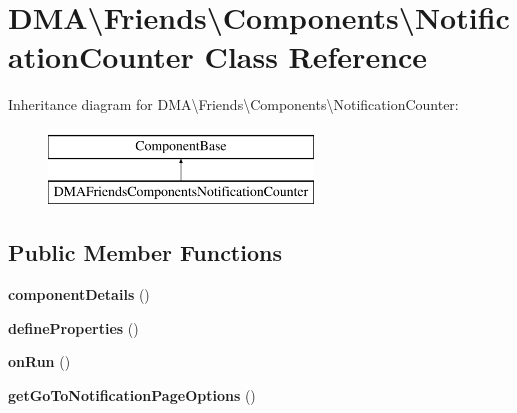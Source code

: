\hypertarget{classDMA_1_1Friends_1_1Components_1_1NotificationCounter}{\section{D\+M\+A\textbackslash{}Friends\textbackslash{}Components\textbackslash{}Notification\+Counter Class Reference}
\label{classDMA_1_1Friends_1_1Components_1_1NotificationCounter}
}
Inheritance diagram for D\+M\+A\textbackslash{}Friends\textbackslash{}Components\textbackslash{}Notification\+Counter\+:\begin{figure}[H]
\begin{center}
\leavevmode
\includegraphics[height=2.000000cm]{d7/def/classDMA_1_1Friends_1_1Components_1_1NotificationCounter}
\end{center}
\end{figure}
\subsection*{Public Member Functions}
\begin{DoxyCompactItemize}
\item 
\hypertarget{classDMA_1_1Friends_1_1Components_1_1NotificationCounter_a670cc0b67254ca6330cb90e78d00ec50}{{\bfseries component\+Details} ()}\label{classDMA_1_1Friends_1_1Components_1_1NotificationCounter_a670cc0b67254ca6330cb90e78d00ec50}

\item 
\hypertarget{classDMA_1_1Friends_1_1Components_1_1NotificationCounter_acc9c8dda0d8fcb5d55f8b6bdcd93914e}{{\bfseries define\+Properties} ()}\label{classDMA_1_1Friends_1_1Components_1_1NotificationCounter_acc9c8dda0d8fcb5d55f8b6bdcd93914e}

\item 
\hypertarget{classDMA_1_1Friends_1_1Components_1_1NotificationCounter_a11868691e1796cd39a3821cf8fa752a0}{{\bfseries on\+Run} ()}\label{classDMA_1_1Friends_1_1Components_1_1NotificationCounter_a11868691e1796cd39a3821cf8fa752a0}

\item 
\hypertarget{classDMA_1_1Friends_1_1Components_1_1NotificationCounter_aa2ef7ee56cae987954e55457d8f790c4}{{\bfseries get\+Go\+To\+Notification\+Page\+Options} ()}\label{classDMA_1_1Friends_1_1Components_1_1NotificationCounter_aa2ef7ee56cae987954e55457d8f790c4}

\end{DoxyCompactItemize}
